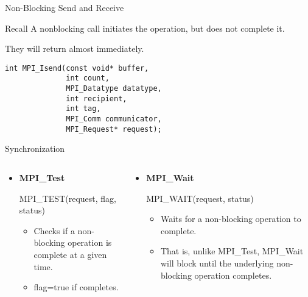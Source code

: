 \begin{frame}[fragile]{Non-Blocking Send and Receive}
\begin{block}{Recall}
    A nonblocking call initiates the operation,
    but does not complete it.
    
    They will return almost immediately.
\end{block}
    
\begin{verbatim}
int MPI_Isend(const void* buffer,
              int count,
              MPI_Datatype datatype,
              int recipient,
              int tag,
              MPI_Comm communicator,
              MPI_Request* request);
\end{verbatim}
\end{frame}

\begin{frame}{Synchronization}
    \begin{columns}
        \begin{column}{.5\textwidth}
        
            \begin{itemize}
                \item \textbf{MPI\_Test}

                MPI\_TEST(request, flag, status)
                
                \begin{itemize}

                \item Checks if a non-blocking operation is complete at a given time.
                
                \item flag=true if completes.
                \end{itemize}
            \end{itemize}
        \end{column}

        \begin{column}{.5\textwidth}
            \begin{itemize}
                \item \textbf{MPI\_Wait}

                MPI\_WAIT(request, status)

                \begin{itemize}
                    \item Waits for a non-blocking operation to complete. 
                    \item That is, unlike MPI\_Test, MPI\_Wait will block until the underlying non-blocking operation completes.
                \end{itemize}
            \end{itemize}
        \end{column}
    \end{columns}
\end{frame}

